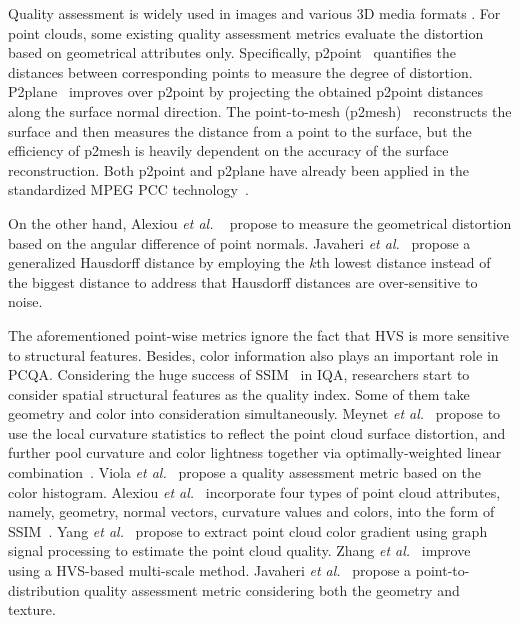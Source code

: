 \documentclass[acmsmall]{acmart}
\begin{document}
\par Quality assessment is widely used in images \cite{Jiang2020IQA1,Jiang2018IQA2} and various 3D media formats \cite{Min2020LF,Zhang2021NR1,Zhang2021NR2,Jiang2020SIQA}. For point clouds, some existing quality assessment metrics evaluate the distortion based on geometrical attributes only. Specifically, p2point~\cite{cignoni1998metro} quantifies the distances between corresponding points to measure the degree of distortion. P2plane~\cite{Mekuria2016Evaluation} improves over p2point by projecting the obtained p2point distances along the surface normal direction. The point-to-mesh (p2mesh)~\cite{Tian2017Evaluation} reconstructs the surface and then measures the distance from a point to the surface, but the efficiency of p2mesh is heavily dependent on the accuracy of the surface reconstruction. Both p2point and p2plane have already been applied in the standardized MPEG PCC technology~\cite{MPEGSoft}.

\par On the other hand, Alexiou \emph{et al.} ~\cite{alexiou2018pointt} propose to measure the geometrical distortion based on the angular difference of point normals. Javaheri \emph{et al.}~\cite{javaheri2020haus} propose a generalized Hausdorff distance by employing the $k$th lowest distance instead of the biggest distance to address that Hausdorff distances are over-sensitive to noise.


\par The aforementioned point-wise metrics ignore the fact that HVS is more sensitive to structural features. Besides, color information also plays an important role in PCQA. Considering the huge success of SSIM~\cite{wang2004image} in IQA, researchers start to consider spatial structural features as the quality index. Some of them take geometry and color into consideration simultaneously. Meynet \emph{et al.}~\cite{meynet2019pcmsdm} propose to use the local curvature statistics to reflect the point cloud surface distortion, and further pool curvature and color lightness together via optimally-weighted linear combination~\cite{meynet2020pcmd}. Viola \emph{et al.}~\cite{viol2020acolor} propose a quality assessment metric based on the color histogram.  Alexiou \emph{et al.}~\cite{alexiou2020TowardsStructural} incorporate four types of point cloud attributes, namely, geometry, normal vectors, curvature values and colors, into the form of SSIM~\cite{wang2004image}. Yang \emph{et al.}~\cite{yang2020graphsim} propose to extract point cloud color gradient using graph signal processing to estimate the point cloud quality. Zhang \emph{et al.}~\cite{Zhang2021MSGraphSIM} improve~\cite{yang2020graphsim} using a HVS-based multi-scale method. Javaheri \emph{et al.}~\cite{javaheri2021PTD} propose a point-to-distribution quality assessment metric considering both the geometry and texture.
\end{document}
